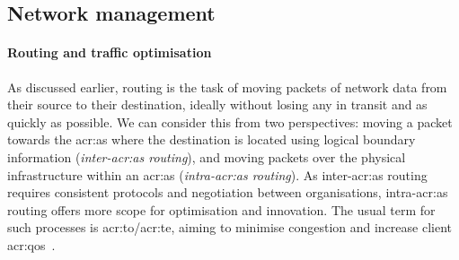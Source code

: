 

\subsection{Network management}

\paragraph{Routing and traffic optimisation}
As discussed earlier, routing is the task of moving packets of network data from their source to their destination, ideally without losing any in transit and as quickly as possible.
We can consider this from two perspectives: moving a packet towards the \gls{acr:as} where the destination is located using logical boundary information (\emph{inter-\gls{acr:as} routing}), and moving packets over the physical infrastructure within an \gls{acr:as} (\emph{intra-\gls{acr:as} routing}).
As inter-\gls{acr:as} routing requires consistent protocols and negotiation between organisations, intra-\gls{acr:as} routing offers more scope for optimisation and innovation.
The usual term for such processes is \gls{acr:to}/\gls{acr:te}, aiming to minimise congestion and increase client \gls{acr:qos}~\parencite{rfc3272}.

